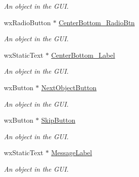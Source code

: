 \begin{DoxyCompactItemize}
\begin{DoxyCompactList}\small\item\em An object in the GUI. \item\end{DoxyCompactList}\item 
\hypertarget{classGUIFrame_a57f6da621afff14276de5edf8e9da9d6}{
wxRadioButton $\ast$ \hyperlink{classGUIFrame_a57f6da621afff14276de5edf8e9da9d6}{CenterBottom\_\-RadioBtn}}
\label{classGUIFrame_a57f6da621afff14276de5edf8e9da9d6}

\begin{DoxyCompactList}\small\item\em An object in the GUI. \item\end{DoxyCompactList}\item 
\hypertarget{classGUIFrame_af87ce45880463459afd23a831046b8b4}{
wxStaticText $\ast$ \hyperlink{classGUIFrame_af87ce45880463459afd23a831046b8b4}{CenterBottom\_\-Label}}
\label{classGUIFrame_af87ce45880463459afd23a831046b8b4}

\begin{DoxyCompactList}\small\item\em An object in the GUI. \item\end{DoxyCompactList}\item 
\hypertarget{classGUIFrame_acd4bb58f56f88356c793384992b2f62b}{
wxButton $\ast$ \hyperlink{classGUIFrame_acd4bb58f56f88356c793384992b2f62b}{NextObjectButton}}
\label{classGUIFrame_acd4bb58f56f88356c793384992b2f62b}

\begin{DoxyCompactList}\small\item\em An object in the GUI. \item\end{DoxyCompactList}\item 
\hypertarget{classGUIFrame_a39ad1e18ab71850e4bc2866ae578bd58}{
wxButton $\ast$ \hyperlink{classGUIFrame_a39ad1e18ab71850e4bc2866ae578bd58}{SkipButton}}
\label{classGUIFrame_a39ad1e18ab71850e4bc2866ae578bd58}

\begin{DoxyCompactList}\small\item\em An object in the GUI. \item\end{DoxyCompactList}\item 
\hypertarget{classGUIFrame_a0ba945ce54179a36f15c134fd7a65d20}{
wxStaticText $\ast$ \hyperlink{classGUIFrame_a0ba945ce54179a36f15c134fd7a65d20}{MessageLabel}}
\label{classGUIFrame_a0ba945ce54179a36f15c134fd7a65d20}

\begin{DoxyCompactList}\small\item\em An object in the GUI. \item\end{DoxyCompactList}\end{DoxyCompactItemize}



